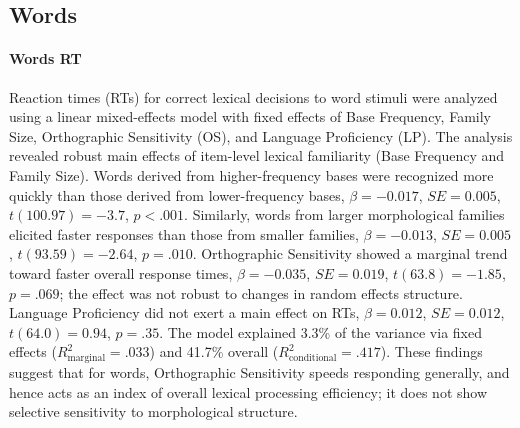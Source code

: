\documentclass[utf8]{FrontiersinHarvard} %
\begin{document}
\subsection{Words}

\paragraph*{Words RT}
Reaction times (RTs) for correct lexical decisions to word stimuli were analyzed using a linear mixed-effects model with fixed effects of Base Frequency, Family Size, Orthographic Sensitivity (OS), and Language Proficiency (LP). The analysis revealed robust main effects of item-level lexical familiarity (Base Frequency and Family Size). Words derived from higher-frequency bases were recognized more quickly than those derived from lower-frequency bases, $\beta = -0.017$, $SE = 0.005$, $t(100.97) = -3.7$, $p < .001$. Similarly, words from larger morphological families elicited faster responses than those from smaller families, $\beta = -0.013$, $SE = 0.005$, $t(93.59) = -2.64$, $p = .010$. Orthographic Sensitivity showed a marginal trend toward faster overall response times, $\beta = -0.035$, $SE = 0.019$, $t(63.8) = -1.85$, $p = .069$; the effect was not robust to changes in random effects structure. Language Proficiency did not exert a main effect on RTs, $\beta = 0.012$, $SE = 0.012$, $t(64.0) = 0.94$, $p = .35$.  The model explained 3.3\% of the variance via fixed effects ($R^2_\mathrm{marginal} = .033$) and 41.7\% overall ($R^2_\mathrm{conditional} = .417$). These findings suggest that for words,  Orthographic Sensitivity speeds responding generally, and hence acts as an index of overall lexical processing efficiency; it does not show selective sensitivity to morphological structure. 
\end{document}
